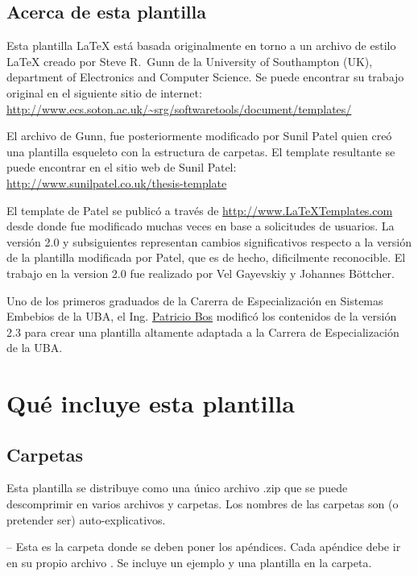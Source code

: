 \subsection{Acerca de esta plantilla}

Esta plantilla \LaTeX{} está basada originalmente en torno a un archivo de estilo \LaTeX{} creado por Steve R.\ Gunn de la  University of Southampton (UK), department of Electronics and Computer Science. Se puede encontrar su trabajo original en el siguiente sitio de internet:
\url{http://www.ecs.soton.ac.uk/~srg/softwaretools/document/templates/}

El archivo de Gunn,  fue posteriormente modificado por Sunil Patel quien creó una plantilla esqueleto con la estructura de carpetas. El template resultante se puede encontrar en el sitio web de Sunil Patel:
\url{http://www.sunilpatel.co.uk/thesis-template}

El template de Patel se publicó a través de  \url{http://www.LaTeXTemplates.com} desde donde fue modificado muchas veces en base a solicitudes de usuarios. La versión 2.0 y subsiguientes representan cambios significativos respecto a la versión de la plantilla modificada por Patel, que es de hecho, dificilmente reconocible. El trabajo en la version 2.0 fue realizado por Vel Gayevskiy y Johannes Böttcher.

Uno de los primeros graduados de la Carerra de Especialización en Sistemas Embebios de la UBA, el Ing. \href{mailto:pbos@fi.uba.ar}{Patricio Bos} modificó los contenidos de la versión 2.3 para crear una plantilla altamente adaptada a la Carrera de Especialización de la UBA.


\section{Qué incluye esta plantilla}

\subsection{Carpetas}

Esta plantilla se distribuye como una único archivo .zip que se puede descomprimir en varios archivos y carpetas. Los nombres de las carpetas son (o pretender ser) auto-explicativos.

 -- Esta es la carpeta donde se deben poner los apéndices. Cada apéndice debe ir en su propio archivo . Se incluye un ejemplo y una plantilla en la carpeta.

